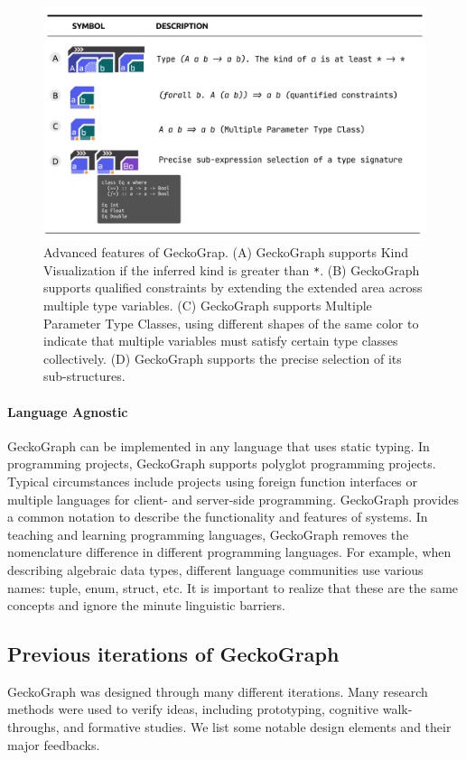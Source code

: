 \begin{figure}[hbt]
  \includegraphics[width=\linewidth]{figures/Advanced}
  \caption[Advanced features of GeckoGrap]{
  \label{fig:advanced-features}
  Advanced features of GeckoGrap. (A) GeckoGraph supports Kind Visualization if the inferred kind is greater than \texttt{*}. (B) GeckoGraph supports qualified constraints by extending the extended area across multiple type variables. (C) GeckoGraph supports Multiple Parameter Type Classes, using different shapes of the same color to indicate that multiple variables must satisfy certain type classes collectively. (D) GeckoGraph supports the precise selection of its sub-structures. }
\end{figure}




\paragraph{Language Agnostic}
GeckoGraph can be implemented in any language that uses static typing. In programming projects, GeckoGraph supports polyglot programming projects. Typical circumstances include projects using foreign function interfaces or multiple languages for client- and server-side programming. GeckoGraph provides a common notation to describe the functionality and features of systems. In teaching and learning programming languages, GeckoGraph removes the nomenclature difference in different programming languages.  For example, when describing algebraic data types, different language communities use various names: tuple, enum, struct, etc. It is important to realize that these are the same concepts and ignore the minute linguistic barriers.

\subsection{Previous iterations of GeckoGraph}
GeckoGraph was designed through many different iterations. Many research methods were used to verify ideas, including prototyping, cognitive walk-throughs, and formative studies.  We list some notable design elements and their major feedbacks.

